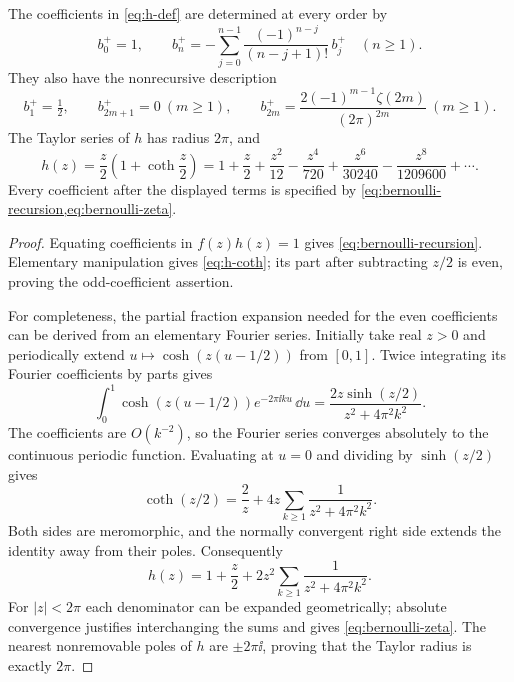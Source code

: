 \begin{proposition}\label{prop:bernoulli}
The coefficients in \cref{eq:h-def} are determined at every order by
\begin{equation}\label{eq:bernoulli-recursion}
 b_0^+=1,\qquad
 b_n^+=-\sum_{j=0}^{n-1}\frac{(-1)^{n-j}}{(n-j+1)!}\,b_j^+
 \quad(n\geq1).
\end{equation}
They also have the nonrecursive description
\begin{equation}\label{eq:bernoulli-zeta}
 b_1^+=\tfrac12,\qquad b_{2m+1}^+=0\ (m\geq1),\qquad
 b_{2m}^+=\frac{2(-1)^{m-1}\zeta(2m)}{(2\pi)^{2m}}\ (m\geq1).
\end{equation}
The Taylor series of $h$ has radius $2\pi$, and
\begin{equation}\label{eq:h-coth}
 h(z)=\frac z2\left(1+\coth\frac z2\right)
 =1+\frac z2+\frac{z^2}{12}-\frac{z^4}{720}
   +\frac{z^6}{30240}-\frac{z^8}{1209600}+\cdots .
\end{equation}
Every coefficient after the displayed terms is specified by \cref{eq:bernoulli-recursion,eq:bernoulli-zeta}.
\end{proposition}
\begin{proof}
Equating coefficients in $f(z)h(z)=1$ gives \cref{eq:bernoulli-recursion}. Elementary manipulation gives \cref{eq:h-coth}; its part after subtracting $z/2$ is even, proving the odd-coefficient assertion.

For completeness, the partial fraction expansion needed for the even coefficients can be derived from an elementary Fourier series. Initially take real $z>0$ and periodically extend $u\mapsto\cosh(z(u-1/2))$ from $[0,1]$. Twice integrating its Fourier coefficients by parts gives
\[
 \int_0^1\cosh(z(u-1/2))e^{-2\pi\ii ku}\,\dd u
 =\frac{2z\sinh(z/2)}{z^2+4\pi^2k^2}.
\]
The coefficients are $O(k^{-2})$, so the Fourier series converges absolutely to the continuous periodic function. Evaluating at $u=0$ and dividing by $\sinh(z/2)$ gives
\[
 \coth(z/2)=\frac2z+4z\sum_{k\geq1}\frac1{z^2+4\pi^2k^2}.
\]
Both sides are meromorphic, and the normally convergent right side extends the identity away from their poles. Consequently
\begin{equation}\label{eq:h-partial-fractions}
 h(z)=1+\frac z2+2z^2\sum_{k\geq1}\frac1{z^2+4\pi^2k^2}.
\end{equation}
For $|z|<2\pi$ each denominator can be expanded geometrically; absolute convergence justifies interchanging the sums and gives \cref{eq:bernoulli-zeta}. The nearest nonremovable poles of $h$ are $\pm2\pi\ii$, proving that the Taylor radius is exactly $2\pi$.
\end{proof}


